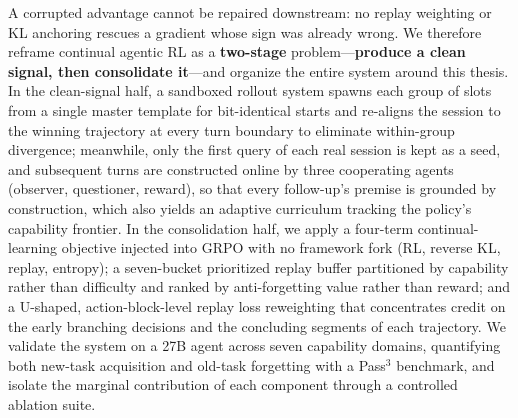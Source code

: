 \begin{abstracten}
A corrupted advantage cannot be repaired downstream: no replay weighting or KL anchoring rescues a gradient whose sign was already wrong. We therefore reframe continual agentic RL as a \textbf{two-stage} problem---\textbf{produce a clean signal, then consolidate it}---and organize the entire system around this thesis. In the clean-signal half, a sandboxed rollout system spawns each group of slots from a single master template for bit-identical starts and re-aligns the session to the winning trajectory at every turn boundary to eliminate within-group divergence; meanwhile, only the first query of each real session is kept as a seed, and subsequent turns are constructed online by three cooperating agents (observer, questioner, reward), so that every follow-up's premise is grounded by construction, which also yields an adaptive curriculum tracking the policy's capability frontier. In the consolidation half, we apply a four-term continual-learning objective injected into GRPO with no framework fork (RL, reverse KL, replay, entropy); a seven-bucket prioritized replay buffer partitioned by capability rather than difficulty and ranked by anti-forgetting value rather than reward; and a U-shaped, action-block-level replay loss reweighting that concentrates credit on the early branching decisions and the concluding segments of each trajectory. We validate the system on a 27B agent across seven capability domains, quantifying both new-task acquisition and old-task forgetting with a Pass$^3$ benchmark, and isolate the marginal contribution of each component through a controlled ablation suite.
\end{abstracten}

